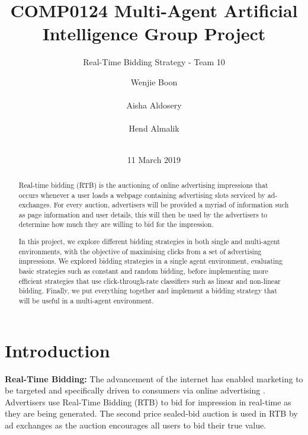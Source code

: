 \documentclass{sig-alternate-05-2015}
\begin{document}

\title{COMP0124 Multi-Agent Artificial Intelligence Group Project}
\subtitle{Real-Time Bidding Strategy - Team 10}


\author{
\alignauthor
Wenjie Boon\\
       \\
\alignauthor
Aisha Aldosery\\
       \\
\alignauthor
Hend Almalik\\
       \\
}

\date{11 March 2019}

\maketitle
\begin{abstract}
Real-time bidding (RTB) is the auctioning of online advertising impressions that occurs whenever a user loads a webpage containing advertising slots serviced by ad-exchanges. For every auction, advertisers will be provided a myriad of information such as page information and user details, this will then be used by the advertisers to determine how much they are willing to bid for the impression.

In this project, we explore different bidding strategies in both single and multi-agent environments, with the objective of maximising clicks from a set of advertising impressions. We explored bidding strategies in a single agent environment, evaluating basic strategies such as constant and random bidding, before implementing more efficient strategies that use click-through-rate classifiers such as linear and non-linear bidding. Finally, we put everything together and implement a bidding strategy that will be useful in a multi-agent environment.

\end{abstract}

\section{Introduction}
\textbf{Real-Time Bidding:}
The advancement of the internet has enabled marketing to be targeted and specifically driven to consumers via online advertising \cite{david_online_2009, gold_targeting_2011}. Advertisers use Real-Time Bidding (RTB) \cite{wang_display_2017} to bid for impression in real-time as they are being generated. The second price sealed-bid auction is used in RTB by ad exchanges \cite{yuan_rev_2014} as the auction encourages all users to bid their true value.
\end{document}
